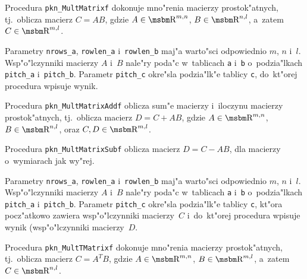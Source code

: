 \vspace{\bigskipamount}
Procedura \texttt{pkn\_MultMatrixf} dokonuje mno"renia macierzy
prostok"atnych, tj.\ oblicza macierz $C=AB$, gdzie $A\in\R^{m,n}$,
$B\in\R^{n,l}$, a~zatem $C\in\R^{m,l}$.

Parametry \texttt{nrows\_a},
\texttt{rowlen\_a} i~\texttt{rowlen\_b} maj"a warto"sci odpowiednio $m$, $n$
i~$l$. Wsp"o"lczynniki macierzy $A$ i~$B$ nale"ry poda"c w~tablicach
\texttt{a} i~\texttt{b} o~podzia"lkach \texttt{pitch\_a}
i~\texttt{pitch\_b}. Parametr \texttt{pitch\_c} okre"sla podzia"lk"e tablicy
\texttt{c}, do~kt"orej procedura wpisuje wynik.

\vspace{\bigskipamount}
Procedura \texttt{pkn\_MultMatrixAddf} oblicza sum"e macierzy i~iloczynu macierzy
prostok"atnych, tj.\ oblicza macierz $D=C+AB$, gdzie $A\in\R^{m,n}$,
$B\in\R^{n,l}$, oraz $C,D\in\R^{m,l}$.

Procedura \texttt{pkn\_MultMatrixSubf} oblicza macierz $D=C-AB$, dla macierzy
o~wymiarach jak wy"rej.

Parametry \texttt{nrows\_a}, \texttt{rowlen\_a} i~\texttt{rowlen\_b} maj"a
warto"sci odpowiednio $m$, $n$ i~$l$. Wsp"o"lczynniki macierzy $A$ i~$B$ nale"ry
poda"c w~tablicach \texttt{a} i~\texttt{b} o~podzia"lkach \texttt{pitch\_a}
i~\texttt{pitch\_b}. Parametr \texttt{pitch\_c} okre"sla podzia"lk"e tablicy
\texttt{c}, kt"ora pocz"atkowo zawiera wsp"o"lczynniki macierzy~$C$
i~do~kt"orej procedura wpisuje wynik (wsp"o"lczynniki macierzy~$D$.

\newpage
Procedura \texttt{pkn\_MultTMatrixf} dokonuje mno"renia macierzy prostok"atnych,
tj.\ oblicza macierz $C=A^TB$, gdzie $A\in\R^{m,n}$,
$B\in\R^{m,l}$, a~zatem $C\in\R^{n,l}$.

